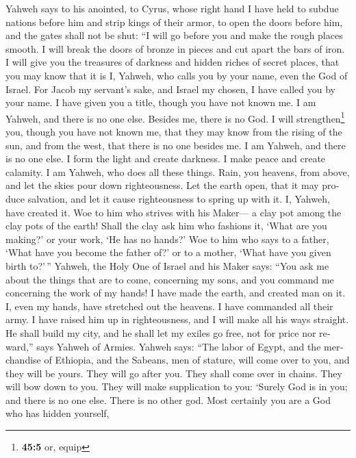 \begin{paracol}{2}
\begin{otherlanguage}{english}
 Yahweh says to his anointed, to Cyrus, whose right hand I
have held to subdue nations before him and strip kings of their armor,
to open the doors before him, and the gates shall not be shut:
 ``I will go before you and make the rough places smooth.
I will break the doors of bronze in pieces and cut apart the bars of
iron.  I will give you the treasures of darkness and
hidden riches of secret places, that you may know that it is I, Yahweh,
who calls you by your name, even the God of Israel.  For
Jacob my servant's sake, and Israel my chosen, I have called you by your
name. I have given you a title, though you have not known me.
 I am Yahweh, and there is no one else. Besides me, there
is no God. I will strengthen\footnote{\textbf{45:5} or, equip} you,
though you have not known me,  that they may know from the
rising of the sun, and from the west, that there is no one besides me. I
am Yahweh, and there is no one else.  I form the light and
create darkness. I make peace and create calamity. I am Yahweh, who does
all these things.  Rain, you heavens, from above, and let
the skies pour down righteousness. Let the earth open, that it may
produce salvation, and let it cause righteousness to spring up with it.
I, Yahweh, have created it.  Woe to him who strives with
his Maker--- a clay pot among the clay pots of the earth! Shall the clay
ask him who fashions it, `What are you making?' or your work, `He has no
hands?'  Woe to him who says to a father, `What have you
become the father of?' or to a mother, `What have you given birth
to?'\,''  Yahweh, the Holy One of Israel and his Maker
says: ``You ask me about the things that are to come, concerning my
sons, and you command me concerning the work of my hands!
 I have made the earth, and created man on it. I, even my
hands, have stretched out the heavens. I have commanded all their army.
 I have raised him up in righteousness, and I will make
all his ways straight. He shall build my city, and he shall let my
exiles go free, not for price nor reward,'' says Yahweh of Armies.
 Yahweh says: ``The labor of Egypt, and the merchandise
of Ethiopia, and the Sabeans, men of stature, will come over to you, and
they will be yours. They will go after you. They shall come over in
chains. They will bow down to you. They will make supplication to you:
`Surely God is in you; and there is no one else. There is no other god.
 Most certainly you are a God who has hidden yourself,

\end{otherlanguage}
\end{paracol}
